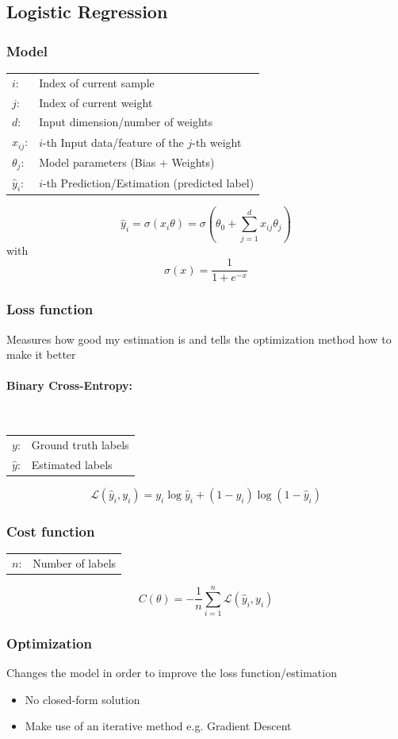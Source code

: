 \documentclass[10pt,a4paper]{article}
\begin{document}
\subsection{Logistic Regression}
\subsubsection{Model}
\begin{tabular}{ll}
	$i$: & Index of current sample \\
	$j$: & Index of current weight \\
	$d$: & Input dimension/number of weights \\
	$x_{ij}$: & $i$-th Input data/feature of the $j$-th weight \\
	$\theta_j$: & Model parameters (Bias + Weights)\\
	$\hat y_i$: & $i$-th Prediction/Estimation (predicted label)
\end{tabular}

$$
	\hat y_i = \sigma(x_i \theta) = \sigma \left(\theta_0 + \sum_{j = 1}^d x_{ij} \theta_j \right)
$$
with
$$
	\sigma(x) = \frac 1 {1 + e^{-x}}
$$

\subsubsection{Loss function}
Measures how good my estimation is and tells the optimization method how to make it better

\paragraph{Binary Cross-Entropy:} ~\\
\begin{tabular}{ll}
	$y$: & Ground truth labels \\
	$\hat y$: & Estimated labels
\end{tabular}
$$
	\mathcal L(\hat y_i, y_i) = y_i \log \hat y_i + (1 - y_i) \log (1 - \hat y_i)
$$

\subsubsection{Cost function}
\begin{tabular}{ll}
	$n$: & Number of labels
\end{tabular}
$$
	C(\theta) = - \frac 1 n \sum_{i = 1}^n \mathcal L(\hat y_i, y_i)
$$

\subsubsection{Optimization}
Changes the model in order to improve the loss function/estimation
\begin{itemize}
	\item No closed-form solution
	\item Make use of an iterative method e.g. Gradient Descent
\end{itemize}
\end{document}
